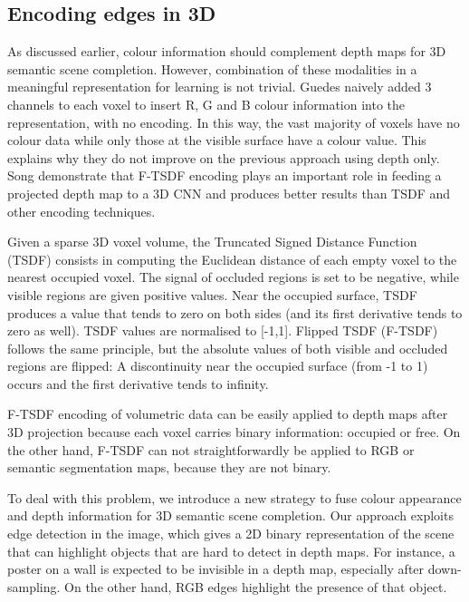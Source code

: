 \subsection{Encoding edges in 3D}
\label{sec:f-tsdf}
As discussed earlier, colour information should complement depth maps for 3D semantic scene completion. However, combination of these modalities in a meaningful representation for learning is not trivial. Guedes \etal\cite{guedes_semantic_2018} naively added 3 channels to each voxel to insert R, G and B colour information into the representation, with no encoding. In this way, the vast majority of voxels have no colour data while only those at the visible surface have a colour value. This explains why they do not improve on the previous approach using depth only.
Song \etal \cite{song_semantic_2017} demonstrate that F-TSDF encoding plays an important role in feeding a projected depth map to a 3D CNN and produces better results than TSDF and other encoding techniques.

Given a sparse 3D voxel volume, the Truncated Signed Distance Function (TSDF) consists in computing the Euclidean distance of each empty voxel to the nearest occupied voxel. The signal of occluded regions is set to be negative, while visible regions are given positive values. Near the occupied surface, TSDF produces a value that tends to zero on both sides (and its first derivative tends to zero as well). TSDF values are normalised to [-1,1]. Flipped TSDF (F-TSDF) follows the same principle, but the absolute values of both visible and occluded regions are flipped: 
A discontinuity near the occupied surface (from -1 to 1) occurs and the first derivative tends to infinity.



F-TSDF encoding of volumetric data can be easily applied to depth maps after 3D projection because each voxel carries binary information: occupied or free. On the other hand, F-TSDF can not straightforwardly be applied to RGB or semantic segmentation maps, because they are not binary.

To deal with this problem, we introduce a new strategy to fuse colour appearance and depth information for 3D semantic scene completion. 
Our approach exploits edge detection in the image, which gives a 2D binary representation of the scene that can highlight objects that are hard to detect in depth maps. For instance, a poster on a wall is expected to be invisible in a depth map, especially after down-sampling. On the other hand, RGB edges highlight the presence of that object. 


